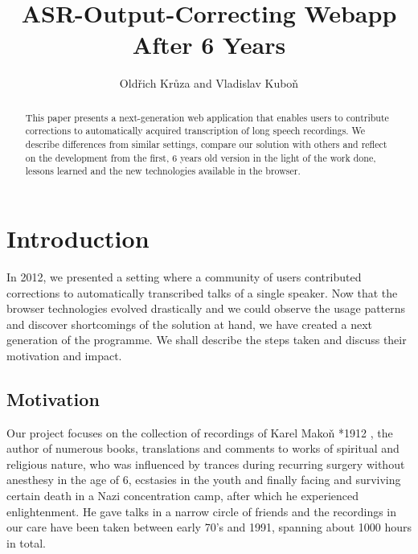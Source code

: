 \documentclass{llncs}
\begin{document}
\newtheorem{Definition}{Definition}
\title{ASR-Output-Correcting Webapp After 6 Years}

\author{Oldřich Krůza and Vladislav Kuboň}

\maketitle

\begin{abstract}

This paper presents a next-generation web application that enables users to
contribute corrections to automatically acquired transcription of long speech
recordings. We describe differences from similar settings, compare our solution
with others and reflect on the development from the first, 6 years old version
in the light of the work done, lessons learned and the new technologies
available in the browser.

\end{abstract}

\section{Introduction}

In 2012\cite{kruuza2012making}, we presented a setting where a community of
users contributed corrections to automatically transcribed talks of a single
speaker. Now that the browser technologies evolved drastically and we could
observe the usage patterns and discover shortcomings of the solution at hand, we
have created a next generation of the programme. We shall describe the steps
taken and discuss their motivation and impact.

\subsection{Motivation}

Our project focuses on the collection of recordings of Karel Mako\v{n} *1912
, the author of numerous books, translations and comments to
works of spiritual and religious nature, who was influenced by trances during
recurring surgery without anesthesy in the age of 6, ecstasies in the youth and
finally facing and surviving certain death in a Nazi concentration camp, after
which he experienced enlightenment. He gave talks in a narrow circle of friends
and the recordings in our care have been taken between early 70's and 1991,
spanning about 1000 hours in total.
\end{document}
